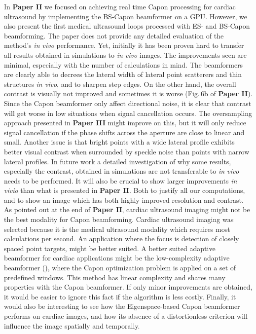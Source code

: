 In \textbf{Paper II} we focused on achieving real time Capon processing for cardiac ultrasound by implementing the BS-Capon beamformer on a GPU. However, we also present the first medical ultrasound loops processed with ES- and BS-Capon beamforming.  The paper does not provide any detailed evaluation of the method's \textit{in vivo} performance. Yet, initially it has been proven hard to transfer all results obtained in simulations to \textit{in vivo} images. The improvements seen are minimal, especially with the number of calculations in mind. The beamformers are clearly able to decrees the lateral width of lateral point scatterers and thin structures \textit{in vivo}, and to sharpen step edges. On the other hand, the overall contrast is visually not improved and sometimes it is worse (Fig.\,6b of \textbf{Paper II}). Since the Capon beamformer only affect directional noise, it is clear that contrast will get worse in low  situations when signal cancellation occurs. The oversampling approach presented in \textbf{Paper III} might improve on this, but it will only reduce signal cancellation if the phase shifts across the aperture are close to linear and small. Another issue is that bright points with a wide lateral profile exhibits better visual contrast when surrounded by speckle noise than points with narrow lateral profiles. In future work a detailed investigation of why some results, especially the contrast, obtained in simulations are not transferable to \textit{in vivo} needs to be performed. It will also be crucial to show larger improvements \textit{in vivio} than what is presented in \textbf{Paper II}. Both to justify all our computations, and to show an image which has both highly improved resolution and contrast. As pointed out at the end of \textbf{Paper II}, cardiac ultrasound imaging might not be the best modality for Capon beamforming. Cardiac ultrasound imaging was selected because it is the medical ultrasound modality which requires most calculations per second. An application where the focus is detection of closely spaced point targets, might be better suited. A better suited adaptive beamformer for cardiac applications might be the low-complexity adaptive beamformer (), where the Capon optimization problem is applied on a set of predefined windows. This method has linear complexity and shares many properties with the Capon beamformer. If only minor improvements are obtained, it would be easier to ignore this fact if the algorithm is less costly. Finally, it would also be interesting to see how the Eigenspace-based Capon beamformer performs on cardiac images, and how its absence of a distortionless criterion will influence the image spatially and temporally.
